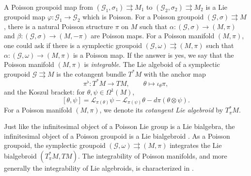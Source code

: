 \documentclass{amsart}
\numberwithin{equation}{section}
\newcommand{\cG}{\mathcal{G}}
\newcommand{\cL}{\mathcal{L}}
\newcommand{\rra}{\rightrightarrows}
\begin{document}
A Poisson groupoid map from $(\cG_1, \sigma_1) \rra M_1$ to $(\cG_2, \sigma_2) \rra M_2$ is a Lie groupoid map $\varphi: \cG_1 \to \cG_2$ which is Poisson.
For a Poisson groupoid $(\cG, \sigma) \rra M$, there is a natural Poisson structure $\pi$ on $M$ such that $\alpha: (\cG, \sigma) \to (M, \pi)$ and $\beta: (\cG, \sigma) \to (M, -\pi)$ are Poisson maps.
For a Poisson manifold $(M, \pi)$, one could ask if there is a symplectic groupoid $(\cG, \omega) \rra (M, \pi)$ such that $\alpha: (\cG, \omega) \to (M, \pi)$ is a Poisson map.
If the answer is yes, we say that the Poisson manifold $(M, \pi)$ is \emph{integrable}.
The Lie algeboid of a symplectic groupoid $\cG \rra M$ is the cotangent bundle $T^*M$ \cite{Wei87} with the anchor map
\[\pi^\flat: T^*M \to TM, \qquad \theta \mapsto \iota_\theta \pi,\]
and the Koszul bracket: for $\theta, \psi \in \Omega^1(M)$,
\[[\theta, \psi] = \cL_{\pi(\theta)} \psi - \cL_{\pi(\psi)} \theta - d\pi(\theta \otimes \psi).\]
For a Poisson manifold $(M, \pi)$, we denote its \emph{cotangent Lie algebroid} by $T^*_\pi M$.

Just like the infinitesimal object of a Poisson Lie group is a Lie bialgebra, the infinitesimal object of a Poisson groupoid is a Lie bialgebroid \cite{MX94}.
As a Poisson groupoid, the symplectic groupoid $(\cG, \omega) \rra (M, \pi)$ integrates the Lie bialgebroid $(T^*_\pi M, TM)$.
The integrability of Poisson manifolds, and more generally the integrability of Lie algebroids, is characterized in \cite{CF03, CF04}.
\end{document}
